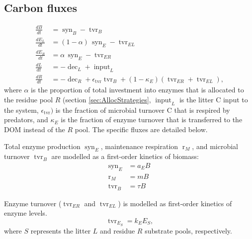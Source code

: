 \subsection{Carbon fluxes}
\begin{subequations}
\label{eq:SEAM}
\begin{align}
\frac{dB}{dt} &= \operatorname{syn}_B - \operatorname{tvr}_B \\
\frac{dE_L}{dt} &= (1 - \alpha)  \, \operatorname{syn}_E -\operatorname{tvr}_{EL}\\
\frac{dE_R}{dt} &= \alpha \, \operatorname{syn}_E - \operatorname{tvr}_{ER} \\
\frac{dL}{dt} &=  - \operatorname{dec}_L + \operatorname{input}_L
\\
\frac{dR}{dt} &=  - \operatorname{dec}_R +
\epsilon_{\operatorname{tvr}}  \operatorname{tvr}_B + (1 -\kappa_E)
(\operatorname{tvr}_{ER} + \operatorname{tvr}_{EL})
\text{,} 
\end{align}
\end{subequations}
where $\alpha$ is the proportion of total investment into enzymes that is
allocated to the residue pool $R$ (section \ref{sec:AllocStrategies},
$\operatorname{input}_L$ is the litter C input to the system,
$\epsilon_{\operatorname{tvr}})$ is the fraction of microbial turnover C that is
respired by predators, and $\kappa_E$ is the fraction of enzyme turnover that is
transferred to the DOM instead of the $R$ pool.
The specific fluxes are detailed below.

Total enzyme production $\operatorname{syn}_E$, maintenance respiration
$\operatorname{r}_{M}$, and microbial turnover $\operatorname{tvr}_B$ are
modelled as a first-order kinetics of biomass:
\begin{subequations}
\begin{align}
\label{eq:synE} \operatorname{syn}_E &= a_E B \\
\label{eq:rM} \operatorname{r}_{M} &= m B \\
\label{eq:tvrB} \operatorname{tvr}_B &= \tau B 
\end{align}
\end{subequations}

Enzyme turnover ($\operatorname{tvr}_{ER}$ and $\operatorname{tvr}_{EL}$) is
modelled as first-order kinetics of enzyme levels.
\begin{equation}
\label{eq:tvrE}
\operatorname{tvr}_{E_S} = k_{E} E_S \text{,}
\end{equation}
where $S$ represents the litter $L$ and residue $R$ substrate pools, respectively.  

